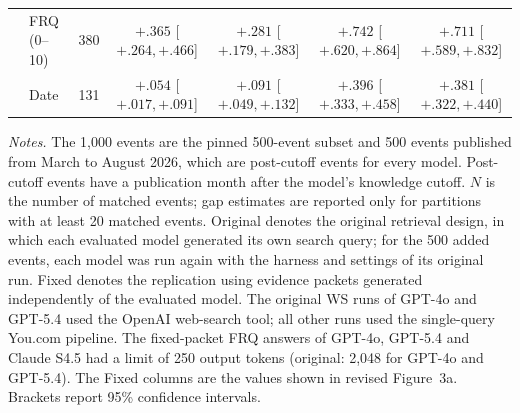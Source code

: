\begin{table}[p]
\begin{tabular}{l l r c c c c}
& FRQ (0--10)
& 380
& $+.365$ {\tiny[$+.264,+.466$]}
& $+.281$ {\tiny[$+.179,+.383$]}
& $+.742$ {\tiny[$+.620,+.864$]}
& $+.711$ {\tiny[$+.589,+.832$]} \\


& Date
& 131
& $+.054$ {\tiny[$+.017,+.091$]}
& $+.091$ {\tiny[$+.049,+.132$]}
& $+.396$ {\tiny[$+.333,+.458$]}
& $+.381$ {\tiny[$+.322,+.440$]} \\
\bottomrule
\end{tabular}

\vspace{3pt}
\begin{minipage}{0.98\textwidth}
\scriptsize
\textit{Notes.}
The 1,000 events are the pinned 500-event subset and 500 events published from March to August 2026, which are post-cutoff events for every model.
Post-cutoff events have a publication month after the model's knowledge cutoff.
$N$ is the number of matched events; gap estimates are reported only for partitions with at least 20 matched events.
Original denotes the original retrieval design, in which each evaluated model generated its own search query; for the 500 added events, each model was run again with the harness and settings of its original run.
Fixed denotes the replication using evidence packets generated independently of the evaluated model.
The original WS runs of GPT-4o and GPT-5.4 used the OpenAI web-search tool; all other runs used the single-query You.com pipeline.
The fixed-packet FRQ answers of GPT-4o, GPT-5.4 and Claude S4.5 had a limit of 250 output tokens (original: 2,048 for GPT-4o and GPT-5.4).
The Fixed columns are the values shown in revised Figure~3a.
Brackets report 95\% confidence intervals.
\end{minipage}

\end{table}
